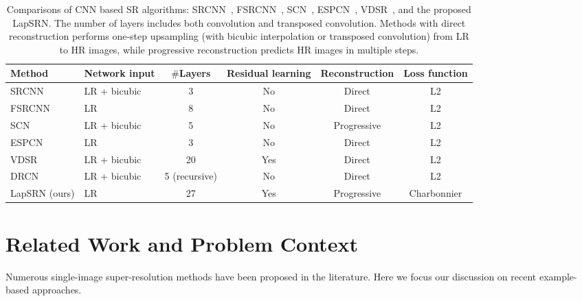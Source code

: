 \documentclass[10pt,twocolumn,letterpaper]{article}
\begin{document}
	
	\begin{table*}
		\centering
		\caption{
			Comparisons of CNN based SR algorithms: SRCNN~\cite{SRCNN}, FSRCNN~\cite{FSRCNN}, SCN~\cite{SCN}, ESPCN~\cite{ESPCN}, VDSR~\cite{VDSR}, and the proposed LapSRN.
			The number of layers includes both convolution and transposed convolution.
			Methods with direct reconstruction performs one-step upsampling (with bicubic interpolation or transposed convolution) from LR to HR images, while progressive reconstruction predicts HR images in multiple steps.
		}
		\vspace{-0.1cm}
		\begin{tabular}{llcccc}
			\toprule
			Method & 
			Network input & 
			$\#$Layers & 
			Residual learning&
			Reconstruction &
			Loss function\\
			\midrule
			SRCNN~\cite{SRCNN} 
			& LR + bicubic & 3 & No & Direct & L2 \\
			FSRCNN~\cite{FSRCNN} 
			& LR & 8 & No & Direct & L2 \\
			SCN~\cite{SCN} 
			& LR + bicubic & 5 & No & Progressive &L2 \\
			ESPCN~\cite{ESPCN} 
			& LR & 3 & No & Direct & L2 \\
			VDSR~\cite{VDSR} 
			& LR + bicubic & 20 & Yes & Direct & L2 \\
			DRCN~\cite{DRCN} 
			& LR + bicubic & 5 (recursive) & No & Direct & L2 \\
			LapSRN (ours) 
			& LR & 27 & Yes &Progressive& Charbonnier \\
			\bottomrule
		\end{tabular}
		\label{tab:CNN-compare}
		\vspace{-0.3cm}
	\end{table*}
	
	
	\section{Related Work and Problem Context}
	
	Numerous single-image super-resolution methods have been proposed in the literature.
	Here we focus our discussion on recent example-based approaches.
	
\end{document}
